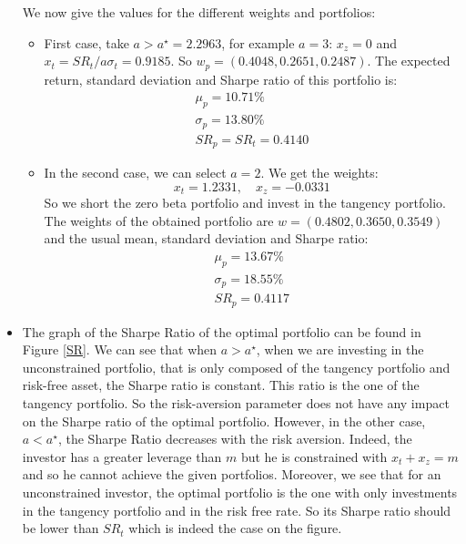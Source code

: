 \documentclass[10pt]{article}
\newenvironment{exercise}[2][Exercise]{\begin{trivlist}
  \item[\hskip \labelsep {\bfseries #1}\hskip \labelsep {\bfseries #2.}]}{\end{trivlist}}
\begin{document}
\begin{exercise}{1}
\begin{itemize}
We now give the values for the different weights and portfolios: 
\begin{itemize}
  \item First case, take $a > a^\star = 2.2963$, for example $a = 3$: $x_z = 0$ and $x_t = SR_t/a\sigma_t = 0.9185$. So $w_p = (0.4048, 0.2651, 0.2487)$. The expected return, standard deviation and Sharpe ratio of this portfolio is: 
  \begin{align*}
    \mu_p = 10.71\% \\
    \sigma_p = 13.80\% \\
    SR_p = SR_t = 0.4140
  \end{align*}
  \item In the second case, we can select $a = 2$. We get the weights: 
   $$ x_t = 1.2331, \quad x_z = -0.0331$$
   So we short the zero beta portfolio and invest in the tangency portfolio. The weights of the obtained portfolio are $w = (0.4802, 0.3650, 0.3549)$ and the usual mean, standard deviation and Sharpe ratio: 
   \begin{align*}
    \mu_p = 13.67\%\\
    \sigma_p = 18.55\% \\
    SR_p = 0.4117
   \end{align*} 
\end{itemize}
  \item The graph of the Sharpe Ratio of the optimal portfolio can be found in Figure \ref{SR}. We can see that when $a>a^\star$, when we are investing in the unconstrained portfolio, that is only composed of the tangency portfolio and risk-free asset, the Sharpe ratio is constant. This ratio is the one of the tangency portfolio. So the risk-aversion parameter does not have any impact on the Sharpe ratio of the optimal portfolio. However, in the other case, $a<a^\star$, the Sharpe Ratio decreases with the risk aversion. Indeed, the investor has a greater leverage than $m$ but he is constrained with $x_t + x_z = m$ and so he cannot achieve the given portfolios. Moreover, we see that for an unconstrained investor, the optimal portfolio is the one with only investments in the tangency portfolio and in the risk free rate. So its Sharpe ratio should be lower than $SR_t$ which is indeed the case on the figure. 
  \begin{figure}[H]
    \centering

\end{figure}
\end{itemize}
\end{exercise}
\end{document}
